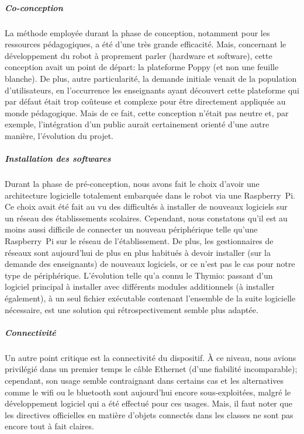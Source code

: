 
\subparagraph{Co-conception}
    La méthode employée durant la phase de conception, notamment pour les ressources pédagogiques, a été d'une très grande efficacité. Mais, concernant le développement du robot à proprement parler (hardware et software), cette conception avait un point de départ: la plateforme Poppy (et non une feuille blanche). De plus, autre particularité, la demande initiale venait de la population d'utilisateurs, en l'occurrence les enseignants ayant découvert cette plateforme qui par défaut était trop coûteuse et complexe pour être directement appliquée au monde pédagogique. Mais de ce fait, cette conception n'était pas neutre et, par exemple, l'intégration  d'un public  aurait certainement orienté d'une autre manière, l'évolution du projet.
\subparagraph{Installation des softwares}
    Durant la phase de pré-conception, nous avons fait le choix d'avoir une architecture logicielle totalement embarquée dans le robot via une Raspberry~Pi.
    Ce choix avait été fait au vu des difficultés à installer de nouveaux logiciels sur un réseau des établissements scolaires. Cependant, nous constatons qu'il est au moins aussi difficile de connecter un nouveau périphérique telle qu'une Raspberry~Pi sur le réseau de l'établissement.%
    De plus, les gestionnaires de réseaux sont aujourd'hui de plus en plus habitués à devoir installer (sur la demande des enseignants) de nouveaux logiciels, or ce n'est pas le cas pour notre type de périphérique.
    L'évolution telle qu'a connu le Thymio: passant d'un logiciel principal à installer avec différents modules additionnels (à installer également), à un seul fichier exécutable contenant l'ensemble de la suite logicielle nécessaire, est une solution qui rétrospectivement semble plus adaptée.
\subparagraph{Connectivité}
    Un autre point critique est la connectivité du dispositif. À ce niveau, nous avions privilégié dans un premier temps le câble Ethernet (d'une fiabilité incomparable); cependant, son usage semble contraignant dans certains cas et les alternatives comme le wifi ou le bluetooth sont aujourd'hui encore sous-exploitées, malgré le développement logiciel qui a été effectué pour ces usages. Mais, il faut noter que les directives officielles en matière d'objets connectés dans les classes ne sont pas encore tout à fait claires.